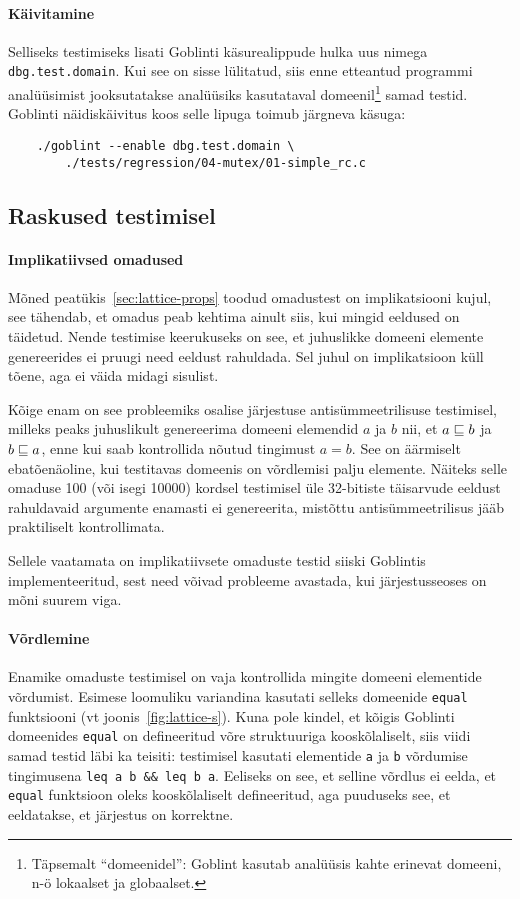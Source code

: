 \documentclass[../thesis.tex]{subfiles}
\begin{document}
\paragraph{Käivitamine}
Selliseks testimiseks lisati Goblinti käsurealippude hulka uus nimega \texttt{dbg.test.domain}. Kui see on sisse lülitatud, siis enne etteantud programmi analüüsimist jooksutatakse analüüsiks kasutataval domeenil\footnote{Täpsemalt \enquote{domeenidel}: Goblint kasutab analüüsis kahte erinevat domeeni, n-ö lokaalset ja globaalset.} samad testid. Goblinti näidiskäivitus koos selle lipuga toimub järgneva käsuga:
\begin{verbatim}
	./goblint --enable dbg.test.domain \
	    ./tests/regression/04-mutex/01-simple_rc.c
\end{verbatim}

\subsection{Raskused testimisel}
\paragraph{Implikatiivsed omadused}
Mõned peatükis~\ref{sec:lattice-props} toodud omadustest on implikatsiooni kujul, see tähendab, et omadus peab kehtima ainult siis, kui mingid eeldused on täidetud. Nende testimise keerukuseks on see, et juhuslikke domeeni elemente genereerides ei pruugi need eeldust rahuldada. Sel juhul on implikatsioon küll tõene, aga ei väida midagi sisulist.

Kõige enam on see probleemiks osalise järjestuse antisümmeetrilisuse testimisel, milleks peaks juhuslikult genereerima domeeni elemendid $a$ ja $b$ nii, et $a \sqsubseteq b$ ja $b \sqsubseteq a$, enne kui saab kontrollida nõutud tingimust $a = b$. See on äärmiselt ebatõenäoline, kui testitavas domeenis on võrdlemisi palju elemente. Näiteks selle omaduse 100 (või isegi 10000) kordsel testimisel üle 32-bitiste täisarvude eeldust rahuldavaid argumente enamasti ei genereerita, mistõttu antisümmeetrilisus jääb praktiliselt kontrollimata.

Sellele vaatamata on implikatiivsete omaduste testid siiski Goblintis implementeeritud, sest need võivad probleeme avastada, kui järjestusseoses on mõni suurem viga.

\paragraph{Võrdlemine}
Enamike omaduste testimisel on vaja kontrollida mingite domeeni elementide võrdumist. Esimese loomuliku variandina kasutati selleks domeenide \texttt{equal} funktsiooni (vt joonis~\ref{fig:lattice-s}). Kuna pole kindel, et kõigis Goblinti domeenides \texttt{equal} on defineeritud võre struktuuriga kooskõlaliselt, siis viidi samad testid läbi ka teisiti: testimisel kasutati elementide \texttt{a} ja \texttt{b} võrdumise tingimusena \texttt{leq a b \&\& leq b a}. Eeliseks on see, et selline võrdlus ei eelda, et \texttt{equal} funktsioon oleks kooskõlaliselt defineeritud, aga puuduseks see, et eeldatakse, et järjestus on korrektne.
\end{document}
